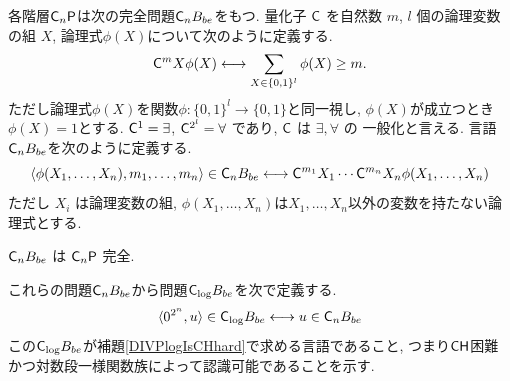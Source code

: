 各階層$\mathsf{C}_n \mathsf{P}$は次の完全問題$\mathsf{C}_n B_{be}$をもつ.
量化子 $\mathsf{C}$ を自然数 $m$, $l$ 個の論理変数の組 $X$,
論理式$\phi(X)$について次のように定義する.
\begin{equation}
 \mathsf{C}^m X \phi(X) 
  \longleftrightarrow 
  \sum_{X \in \{0,1\}^l} \phi(X) \ge m.
\end{equation}
ただし論理式$\phi(X)$を関数$\phi \colon \{0,1\}^l \to \{0,1\}$と同一視し,
$\phi(X)$が成立つとき$\phi(X)=1$とする.
$\mathsf{C}^1 = \exists$, $\mathsf{C}^{2^l} = \forall$ であり, $\mathsf{C}$ は $\exists, \forall$ の
一般化と言える.
言語$\mathsf{C}_n B_{be}$を次のように定義する.
\begin{equation}
 \langle \phi(X_1, \dots, X_n), m_1, \dots, m_n \rangle \in \mathsf{C}_n B_{be}
 \longleftrightarrow
 \mathsf{C}^{m_1}{X_1} \cdots \mathsf{C}^{m_n}{X_n} \phi(X_1, \dots, X_n) 
\end{equation}
ただし
$X_i$ は論理変数の組,
$\phi(X_1, \dots, X_n)$は$X_1, \dots, X_n$以外の変数を持たない論理式とする.

\begin{lemma} \label{lemma:CnP-complete}
 $\mathsf{C}_n B_{be}$ は $\mathsf{C}_n\mathsf{P}$ 完全.
\end{lemma}

これらの問題$\mathsf{C}_n B_{be}$から問題$\mathsf{C}_{\log} B_{be}$を次で定義する.
\begin{equation}
 \langle 0^{2^n}, u \rangle \in \mathsf{C}_{\log} B_{be}
 \longleftrightarrow
 u \in \mathsf{C}_n B_{be}
\end{equation}
この$\mathsf{C}_{\log} B_{be}$が補題\ref{DIVPlogIsCHhard}で求める言語であること,
つまり$\mathsf{CH}$困難かつ対数段一様関数族によって認識可能であることを示す.

